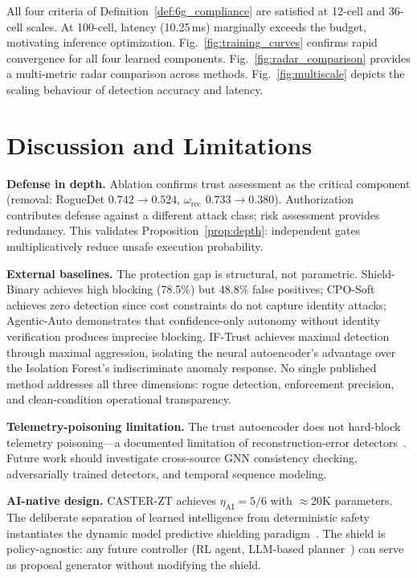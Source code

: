 \documentclass[lettersize,journal]{IEEEtran}
\begin{document}
All four criteria of Definition~\ref{def:6g_compliance} are satisfied at 12-cell and 36-cell scales.
At 100-cell, latency (10.25\,ms) marginally exceeds the budget, motivating inference optimization.
Fig.~\ref{fig:training_curves} confirms rapid convergence for all four learned components.
Fig.~\ref{fig:radar_comparison} provides a multi-metric radar comparison across methods.
Fig.~\ref{fig:multiscale} depicts the scaling behaviour of detection accuracy and latency.


\section{Discussion and Limitations}
\label{sec:discussion}

\noindent\textbf{Defense in depth.}
Ablation confirms trust assessment as the critical component (removal: RogueDet $0.742 \to 0.524$, $\omega_{\mathrm{rec}}$ $0.733 \to 0.380$).
Authorization contributes defense against a different attack class; risk assessment provides redundancy.
This validates Proposition~\ref{prop:depth}: independent gates multiplicatively reduce unsafe execution probability.

\noindent\textbf{External baselines.}
The protection gap is structural, not parametric.
Shield-Binary achieves high blocking (78.5\%) but 48.8\% false positives; CPO-Soft achieves zero detection since cost constraints do not capture identity attacks; Agentic-Auto demonstrates that confidence-only autonomy without identity verification produces imprecise blocking.
IF-Trust achieves maximal detection through maximal aggression, isolating the neural autoencoder's advantage over the Isolation Forest's indiscriminate anomaly response.
No single published method addresses all three dimensions: rogue detection, enforcement precision, and clean-condition operational transparency.

\noindent\textbf{Telemetry-poisoning limitation.}
The trust autoencoder does not hard-block telemetry poisoning---a documented limitation of reconstruction-error detectors~\cite{pang2021deep,erba2020constrained,kravchik2022efficient}.
Future work should investigate cross-source GNN consistency checking, adversarially trained detectors, and temporal sequence modeling.

\noindent\textbf{AI-native design.}
CASTER-ZT achieves $\eta_{\mathrm{AI}} = 5/6$ with $\approx$20K parameters.
The deliberate separation of learned intelligence from deterministic safety instantiates the dynamic model predictive shielding paradigm~\cite{roderick2024dmps}.
The shield is policy-agnostic: any future controller (RL agent, LLM-based planner~\cite{toward_autonomous_oran_2026,lee2024llmran}) can serve as proposal generator without modifying the shield.
\end{document}
